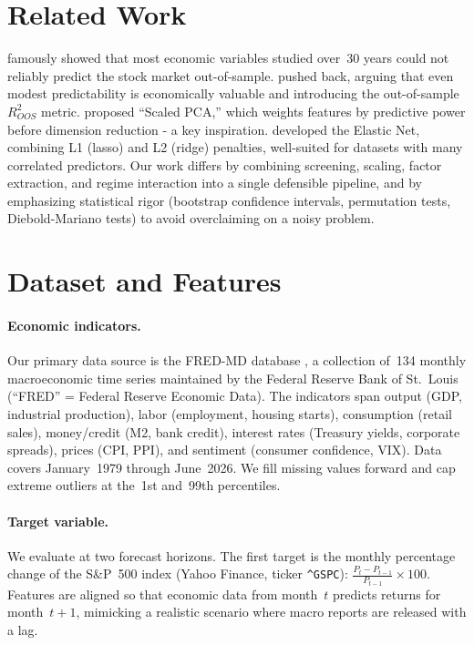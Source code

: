 \documentclass{article}
\begin{document}
\section{Related Work}

\citet{goyal2008comprehensive} famously showed that most economic variables
studied over~30 years could not reliably predict the stock market out-of-sample.
\citet{campbell2008predicting} pushed back, arguing that even modest
predictability is economically valuable and introducing the out-of-sample
$R^2_{OOS}$ metric. \citet{huang2022scaled} proposed ``Scaled PCA,'' which
weights features by predictive power before dimension reduction - a key
inspiration. \citet{zou2005regularization} developed the Elastic Net,
combining L1 (lasso) and L2 (ridge) penalties, well-suited for datasets with
many correlated predictors. Our work differs by combining screening, scaling,
factor extraction, and regime interaction into a single defensible pipeline,
and by emphasizing statistical rigor (bootstrap confidence intervals,
permutation tests, Diebold-Mariano tests) to avoid overclaiming on a noisy
problem.


\section{Dataset and Features}

\paragraph{Economic indicators.}
Our primary data source is the FRED-MD database \citep{mccracken2016fredmd},
a collection of~134 monthly macroeconomic time series maintained by the
Federal Reserve Bank of St.\ Louis (``FRED'' = Federal Reserve Economic Data).
The indicators span output (GDP, industrial production), labor (employment,
housing starts), consumption (retail sales), money/credit (M2, bank credit),
interest rates (Treasury yields, corporate spreads), prices (CPI, PPI),
and sentiment (consumer confidence, VIX). Data covers January~1979 through
June~2026. We fill missing values forward and cap extreme outliers at the~1st
and~99th percentiles.

\paragraph{Target variable.}
We evaluate at two forecast horizons. The first target is the monthly
percentage change of the S\&P~500 index (Yahoo Finance, ticker
\texttt{\^{}GSPC}): $\frac{P_t - P_{t-1}}{P_{t-1}} \times 100$.
Features are aligned so that economic data from month~$t$ predicts returns
for month~$t+1$, mimicking a realistic scenario where macro reports are
released with a lag.
\end{document}
